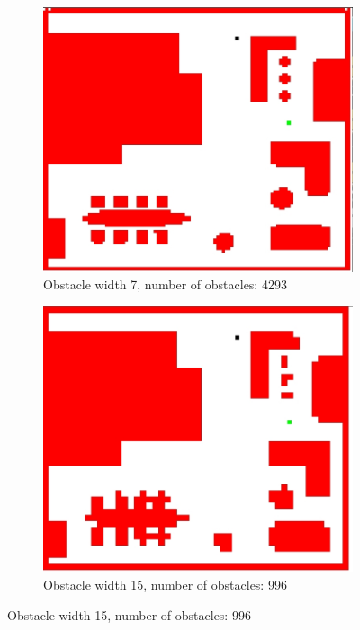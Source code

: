 \begin{enumerate}
\begin{figure}[!h]
	\hfill
	\begin{subfigure}[b]{.5\textwidth}
		\centering
		\includegraphics[width=.95\linewidth]{figures/obs_width_7_total_obs_4293.jpg}
		\caption{Obstacle width 7, number of obstacles: 4293}
		\label{fig:obsmap_sfig3}
	\end{subfigure}
	\begin{subfigure}[b]{.5\textwidth}
		\centering
		\includegraphics[width=.95\linewidth]{figures/obs_width_15_total_obs_996.jpg}
		\caption{Obstacle width 15, number of obstacles: 996}
		\label{fig:obsmap_sfig4}
\end{subfigure}

\end{figure}
\end{enumerate}
